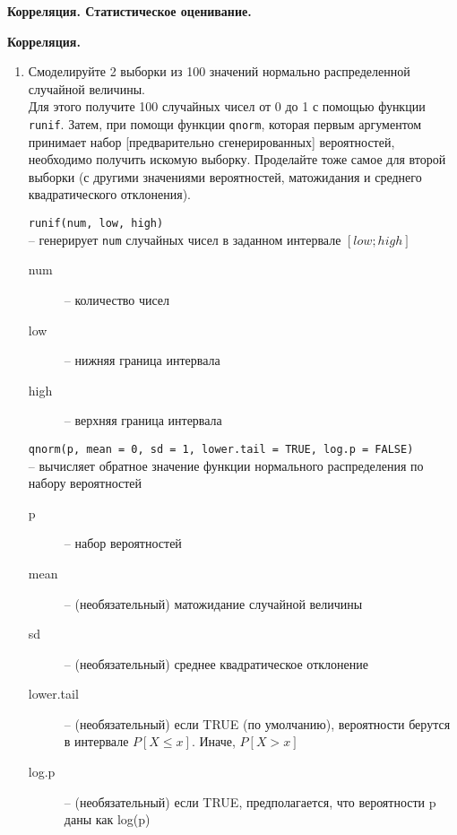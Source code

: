 
\textbf{\large Корреляция. Статистическое оценивание.}

\textbf{Корреляция.}

\begin{enumerate}

    \item Смоделируйте 2 выборки из 100 значений нормально распределенной случайной величины. \\
          Для этого получите 100 случайных чисел от 0 до 1 с помощью функции \texttt{runif}.
          Затем, при помощи функции \texttt{qnorm}, которая первым аргументом принимает 
          набор [предварительно сгенерированных] вероятностей, необходимо получить искомую выборку.
          Проделайте тоже самое для второй выборки (с другими значениями вероятностей, матожидания 
          и среднего квадратического отклонения).

          \begin{mdframed}[style=BadassFrame]

              \texttt{runif(num, low, high)} \\-- генерирует \texttt{num} случайных чисел в заданном интервале $[low; high]$  
              \begin{description}

                \item[num] -- количество чисел
                \item[low] -- нижняя граница интервала
                \item[high] -- верхняя граница интервала
              \end{description}
          \end{mdframed}

          \begin{mdframed}[style=BadassFrame]

              \texttt{qnorm(p, mean = 0, sd = 1, lower.tail = TRUE, log.p = FALSE)} \\
                -- вычисляет обратное значение функции нормального распределения по набору вероятностей
              \begin{description}

                \item[p] -- набор вероятностей
                \item[mean] -- (необязательный) матожидание случайной величины
                \item[sd] -- (необязательный) среднее квадратическое отклонение
                \item[lower.tail] -- (необязательный) если TRUE (по умолчанию), вероятности берутся в интервале $P[X \leq x]$. Иначе, $P[X > x]$ 
                \item[log.p] -- (необязательный) если TRUE, предполагается, что вероятности p даны как log(p)
              \end{description}
          \end{mdframed}


\end{enumerate}
